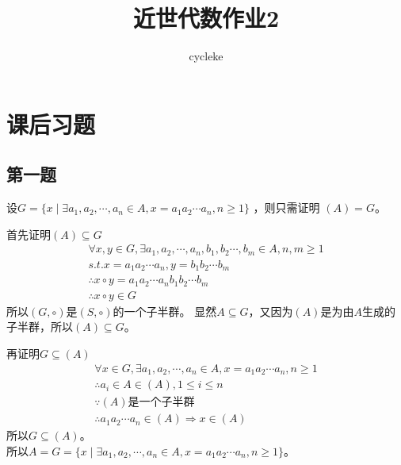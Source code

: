 \documentclass[12pt,onecolumn]{article}
\title{近世代数作业2}
\author{cycleke}
\theoremstyle{plain}
\begin{document}
\maketitle
\tableofcontents
\clearpage

\section{课后习题}
\subsection{第一题}
\begin{proof*}
  设$G = \{ x \mid \exists a_1,a_2,\cdots,a_n \in A, x = a_1a_2\cdots a_n,n \geq 1\}$
  ，则只需证明 $(A) = G$。

  首先证明$(A) \subseteq G$
  \begin{gather*}
    \forall x,y \in G, \exists a_1,a_2,\cdots,a_n,b_1,b_2\cdots,b_m \in A, n,m \geq 1\\
    s.t. x = a_1a_2\cdots a_n, y = b_1b_2\cdots b_m \\
    \therefore x \circ y = a_1a_2\cdots a_nb_1b_2\cdots b_m \\
    \therefore x \circ y \in G
  \end{gather*}
  \indent 所以$(G, \circ)$是$(S, \circ)$的一个子半群。
  显然$A \subseteq G$，又因为$(A)$是为由$A$生成的子半群，所以$(A) \subseteq G$。

  再证明$G \subseteq (A)$
  \begin{gather*}
    \forall x \in G, \exists a_1,a_2,\cdots,a_n \in A, x = a_1a_2\cdots a_n,n \geq 1 \\
    \therefore a_i \in A \in (A), 1 \leq i \leq n \\
    \because (A)\text{是一个子半群} \\
    \therefore a_1a_2\cdots a_n \in (A) \Rightarrow x \in (A)
  \end{gather*}
  \indent 所以$G \subseteq (A)$。\\
  \indent 所以$A = G = \{ x \mid \exists a_1,a_2,\cdots,a_n \in A, x = a_1a_2\cdots a_n,n \geq 1\}$。
\end{proof*}
\end{document}
